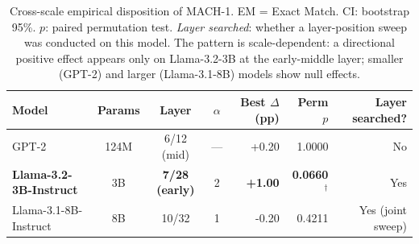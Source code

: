 \begin{table}[htbp]
\caption{Cross-scale empirical disposition of MACH-1. EM = Exact Match. CI: bootstrap 95\%. $p$: paired permutation test. \emph{Layer searched}: whether a layer-position sweep was conducted on this model. The pattern is scale-dependent: a directional positive effect appears only on Llama-3.2-3B at the early-middle layer; smaller (GPT-2) and larger (Llama-3.1-8B) models show null effects.}
\label{tab:cross-scale}
\centering\renewcommand{\arraystretch}{1.15}
\begin{tabular}{l c c c r r r}
\toprule
Model & Params & Layer & $\alpha$ & Best $\Delta$ (pp) & Perm $p$ & Layer searched? \\
\midrule
GPT-2                & 124M & 6/12 (mid) & --- & +0.20 & 1.0000 & No \\
\textbf{Llama-3.2-3B-Instruct}    & 3B   & \textbf{7/28 (early)} & 2 & \textbf{+1.00} & \textbf{0.0660$^{\dagger}$} & Yes \\
Llama-3.1-8B-Instruct    & 8B   & 10/32 & 1 & -0.20 & 0.4211 & Yes (joint sweep) \\
\bottomrule\end{tabular}\end{table}
